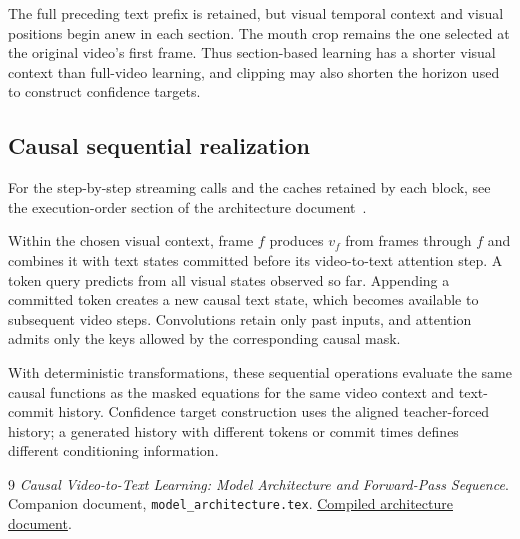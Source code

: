 \documentclass[11pt,a4paper]{article}
\numberwithin{equation}{section}
\begin{document}
The full preceding text prefix is retained, but visual temporal
context and visual positions begin anew in each section. The mouth
crop remains the one selected at the original video's first frame.
Thus section-based learning has a shorter visual context than
full-video learning, and clipping may also shorten the horizon used
to construct confidence targets.

\subsection{Causal sequential realization}

For the step-by-step streaming calls and the caches retained by each
block, see the execution-order section of the architecture
document~\cite{architecture}.

Within the chosen visual context, frame $f$ produces $v_f$ from frames
through $f$ and combines it with text states committed before its
video-to-text attention step. A token query predicts from all visual
states observed so far. Appending a committed token creates a new
causal text state, which becomes available to subsequent video steps.
Convolutions retain only past inputs, and attention admits only the
keys allowed by the corresponding causal mask.

With deterministic transformations, these sequential operations
evaluate the same causal functions as the masked equations for the
same video context and text-commit history. Confidence target
construction uses the aligned teacher-forced history; a generated
history with different tokens or commit times defines different
conditioning information.

\begin{thebibliography}{9}
\emph{Causal Video-to-Text Learning: Model Architecture and Forward-Pass
Sequence}. Companion document, \texttt{model\_architecture.tex}.
\href{model_architecture.pdf}{Compiled architecture document}.
\end{thebibliography}
\end{document}
